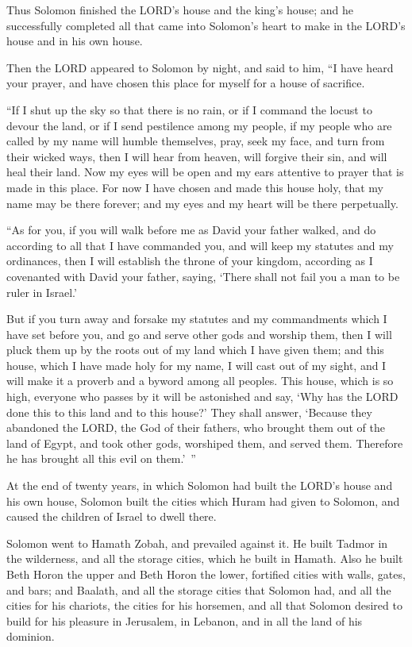 \myverse{}Thus Solomon finished the LORD’s house and the king’s house;
and he successfully completed all that came into Solomon’s heart to make in the LORD’s house and in his
own house.

\myverse{}Then the LORD appeared to Solomon by night, and said to him,
“I have heard your prayer, and have chosen this place for myself for a house of sacrifice.

\myverse{}“If I shut up the sky so that there is no rain, or if I command
the locust to devour the land, or if I send pestilence among my people,
\myverse{}if my people who are called by my name will humble themselves, pray, seek
my face, and turn from their wicked ways, then I will hear from heaven, will forgive their sin, and will
heal their land.
\myverse{}Now my eyes will be open and my ears attentive to prayer that is made in this
place.
\myverse{}For now I have chosen and made this house holy, that my name may be there
forever; and my eyes and my heart will be there perpetually.

\myverse{}“As for you, if you will walk before me as David your father
walked, and do according to all that I have commanded you, and will keep my statutes and my ordinances,
\myverse{}then I will establish the throne of your kingdom, according as I covenanted
with David your father, saying, ‘There shall not fail you a man to be ruler in Israel.’

\myverse{}But if you turn away and forsake my statutes and my commandments
which I have set before you, and go and serve other gods and worship them,
\myverse{}then I will pluck them up by the roots out of my land which I have given them;
and this house, which I have made holy for my name, I will cast out of my sight, and I will make it a
proverb and a byword among all peoples.
\myverse{}This house, which is so high, everyone who passes by it will be astonished
and say, ‘Why has the LORD done this to this land and to this house?’
\myverse{}They shall answer, ‘Because they abandoned the LORD, the God of their fathers,
who brought them out of the land of Egypt, and took other gods, worshiped them, and served them. Therefore
he has brought all this evil on them.’ ”


\mychapter{} \myverse*{}At the end of twenty years, in which Solomon had built the LORD’s
house and his own house,
\myverse{}Solomon built the cities which Huram had given to Solomon, and caused the children
of Israel to dwell there.

\myverse{}Solomon went to Hamath Zobah, and prevailed against it.
\myverse{}He built Tadmor in the wilderness, and all the storage cities, which he built
in Hamath.
\myverse{}Also he built Beth Horon the upper and Beth Horon the lower, fortified cities
with walls, gates, and bars;
\myverse{}and Baalath, and all the storage cities that Solomon had, and all the cities
for his chariots, the cities for his horsemen, and all that Solomon desired to build for his pleasure
in Jerusalem, in Lebanon, and in all the land of his dominion.

